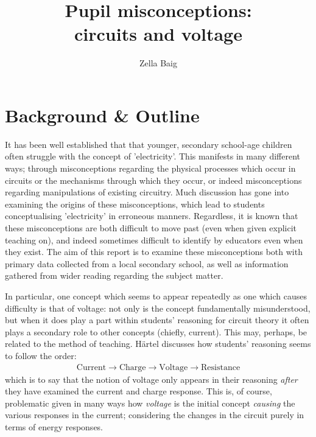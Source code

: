 \documentclass[a4paper,openany,nobib]{tufte-book}
\title{Pupil misconceptions:\\ \noindent circuits and voltage}
\author{Zella Baig}
\begin{document}
\frontmatter
{\maketitle}
\tableofcontents
\thispagestyle{empty}
\mainmatter
\chapter{Background \& Outline}
\setcounter{page}{1}
It has been well established that that younger, secondary school-age children often struggle with the concept of 'electricity'\autocite{psillos}.
This manifests in many different ways;
through misconceptions regarding the physical processes which occur in circuits or the mechanisms through which they occur, or indeed misconceptions regarding manipulations of existing circuitry. Much discussion has gone into examining the origins of these misconceptions,
which lead to students conceptualising 'electricity' in erroneous manners.
Regardless, it is known that these misconceptions are both difficult to move past (even when given explicit teaching on), and indeed sometimes difficult to identify by educators even when they exist\autocite{lee2001}. The aim of this report is to examine these misconceptions both with primary data collected from a local secondary school, as well as information gathered from wider reading regarding the subject matter.

In particular, one concept which seems to appear repeatedly as one which causes difficulty is that of voltage: not only is the concept fundamentally misunderstood\autocite{shipstone_children}, but when it does play a part within students' reasoning for circuit theory it often plays a secondary role to other concepts (chiefly, current). This may, perhaps, be related to the method of teaching. Härtel\autocite{hartel82} discusses how students' reasoning seems to follow the order:
\begin{align*}
	\text{Current}\rightarrow \text{Charge} \rightarrow \text{Voltage} \rightarrow \text{Resistance}
\end{align*}
which is to say that the notion of voltage only appears in their reasoning \emph{after} they have examined the current and charge response. This is, of course, problematic given in many ways how \emph{voltage} is the initial concept \emph{causing} the various responses in the current; considering the changes in the circuit purely in terms of energy responses.
\end{document}
